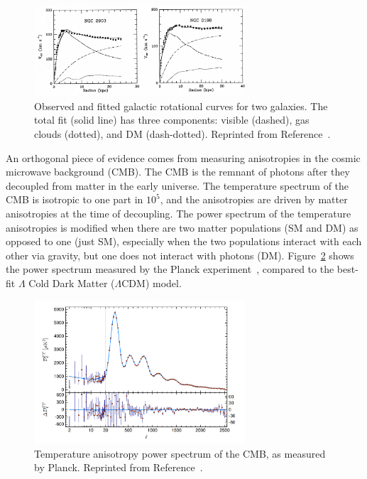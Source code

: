 \begin{figure}[]
\begin{center}
    \includegraphics[width=0.7\textwidth]{figures/theory/dm_rot.png}
    \caption{Observed and fitted galactic rotational curves for two galaxies.
             The total fit (solid line) has three components: visible (dashed), gas clouds (dotted), and DM (dash-dotted). 
             Reprinted from Reference~\cite{dmrot}.}
    \label{fig:theory:dm_rot}
\end{center}
\end{figure}

An orthogonal piece of evidence comes from measuring anisotropies in the cosmic microwave background (CMB).
The CMB is the remnant of photons after they decoupled from matter in the early universe.
The temperature spectrum of the CMB is isotropic to one part in $10^5$, and the anisotropies are driven by matter anisotropies at the time of decoupling.
The power spectrum of the temperature anisotropies is modified when there are two matter populations (SM and DM) as opposed to one (just SM), especially when the two populations interact with each other via gravity, but one does not interact with photons (DM).
Figure~\ref{fig:theory:planck} shows the power spectrum measured by the Planck experiment~\cite{planck}, compared to the best-fit $\Lambda$ Cold Dark Matter ($\Lambda$CDM) model.

\begin{figure}[]
\begin{center}
    \includegraphics[width=0.7\textwidth]{figures/theory/planck.png}
    \caption{Temperature anisotropy power spectrum of the CMB, as measured by Planck.
             Reprinted from Reference~\cite{planck}.}
    \label{fig:theory:planck}
\end{center}
\end{figure}

